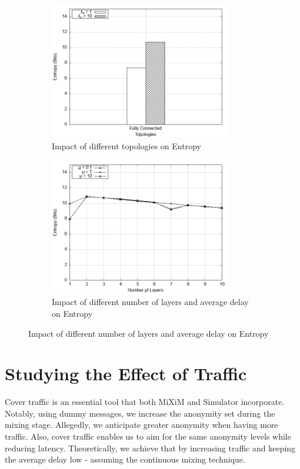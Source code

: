 \documentclass[logo,msc,cyber]{infthesis}   %
\begin{document}
\begin{figure}[h!]
    \centering
    \begin{subfigure}[b]{0.45\textwidth}
        \centering
        \includegraphics[height=6cm]{figures/mixim/2.png}
        \caption{Impact of different topologies on Entropy}
        \label{fig:mixim-different-topologies}
    \end{subfigure}
    \hfill
    \begin{subfigure}[b]{0.45\textwidth}
        \centering
        \includegraphics[height=6cm]{figures/mixim/3.png}
        \caption{Impact of different number of layers and average delay on Entropy}
        \label{fig:mixim-different-layers}
    \end{subfigure}
 \end{figure}

\section{Studying the Effect of Traffic}

Cover traffic is an essential tool that both MiXiM and Simulator incorporate.
Notably, using dummy messages, we increase the anonymity set during the mixing
stage. Allegedly, we anticipate greater anonymity when having more traffic.
Also, cover traffic enables us to aim for the same anonymity levels while
reducing latency. Theoretically, we achieve that by increasing traffic and
keeping the average delay low - assuming the continuous mixing technique. 
\end{document}
